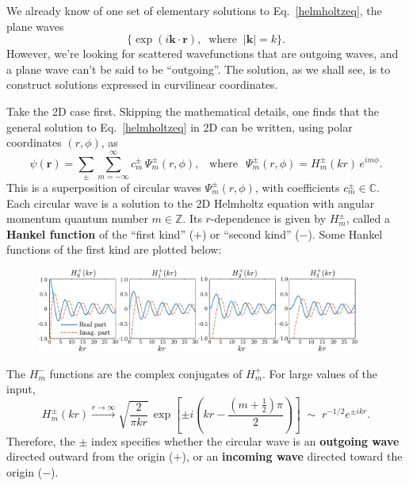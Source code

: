 \documentclass[pra,12pt]{revtex4}
\begin{document}
We already know of one set of elementary solutions to
Eq.~\eqref{helmholtzeq}, the plane waves
\begin{equation*}
  \big\{\exp(i\mathbf{k}\cdot\mathbf{r}),\;\;\mathrm{where}\;\;
  |\mathbf{k}| = k \big\}.
\end{equation*}
However, we're looking for scattered wavefunctions that are outgoing
waves, and a plane wave can't be said to be ``outgoing''.  The
solution, as we shall see, is to construct solutions expressed in
curvilinear coordinates.

Take the 2D case first.  Skipping the mathematical details, one finds
that the general solution to Eq.~\eqref{helmholtzeq} in 2D can be
written, using polar coordinates $(r,\phi)$, as
\begin{equation}
  \psi(\mathbf{r})=\sum_{\pm}\sum_{m=-\infty}^\infty c_m^\pm\,\Psi_m^\pm(r,\phi), \;\;\;\mathrm{where}\;\;\,\Psi_m^\pm(r,\phi) = H_m^\pm(kr)\,e^{im\phi}.
\end{equation}
This is a superposition of circular waves $\Psi_m^\pm(r,\phi)$, with
coefficients $c_m^\pm \in \mathbb{C}$.  Each circular wave is a
solution to the 2D Helmholtz equation with angular momentum quantum
number $m \in \mathbb{Z}$.  Its $r$-dependence is given by $H_m^\pm$,
called a \textbf{Hankel function} of the ``first kind'' ($+$) or
``second kind'' ($-$).  Some Hankel functions of the first kind are
plotted below:

\begin{figure}[h!]
  \centering\includegraphics[width=0.95\textwidth]{besselh}
\end{figure}

The $H^-_m$ functions are the complex conjugates of $H^+_m$.  For
large values of the input,
\begin{equation}
  H_m^\pm(kr) \overset{r\rightarrow\infty}{\longrightarrow} \sqrt{\frac{2}{\pi kr}} \, \exp\left[\pm i\left(kr - \frac{(m+\frac{1}{2})\pi}{2}\right)\right] \;\sim\; r^{-1/2} e^{\pm ikr}.
\end{equation}
Therefore, the $\pm$ index specifies whether the circular wave is an
\textbf{outgoing wave} directed outward from the origin ($+$), or an
\textbf{incoming wave} directed toward the origin ($-$).
\end{document}
